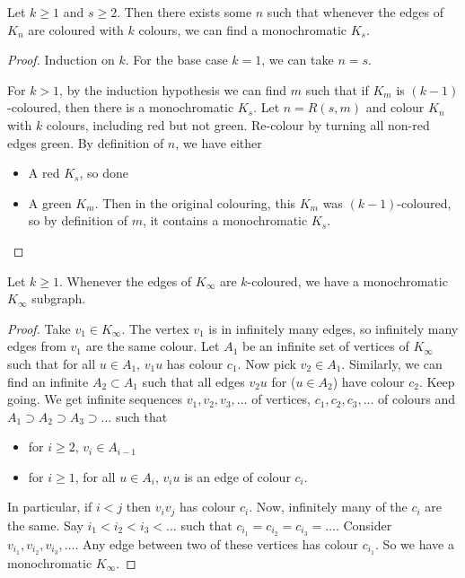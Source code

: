 \documentclass{article}
\newcommand{\red}[1]{\textcolor{bred}{#1}}
\newcommand{\green}[1]{\textcolor{bgreen}{#1}}
\begin{document}
\begin{nthm}\label{thm:multiRamsey}
    Let $k \geq 1$ and $s \geq 2$.
    Then there exists some $n$ such that whenever the edges of $K_n$ are coloured with $k$ colours, we can find a monochromatic $K_s$.
\end{nthm}
\begin{proof}
    Induction on $k$. For the base case $k=1$, we can take $n=s$.

    For $k>1$, by the induction hypothesis we can find $m$ such that if $K_m$ is $(k-1)$-coloured, then there is a monochromatic $K_s$.
    Let $n = R(s, m)$ and colour $K_n$ with $k$ colours, including \red{red} but not \green{green}.
    Re-colour by turning all non-red edges \green{green}.
    By definition of $n$, we have either
    \begin{itemize}
        \item A \red{red $K_s$}, so done
        \item A \green{green $K_m$}. Then in the original colouring, this $K_m$ was $(k-1)$-coloured, so by definition of $m$, it contains a monochromatic $K_s$. \qedhere
    \end{itemize}
\end{proof}

















\begin{nthm}\label{thm:infRamsey}
    Let $k \geq 1$. Whenever the edges of $K_\infty$ are $k$-coloured, we have a monochromatic $K_\infty$ subgraph.
\end{nthm}
\begin{proof}
    Take $v_1 \in K_\infty$.  The vertex $v_1$ is in infinitely many edges, so infinitely many edges from $v_1$ are the same colour.
    Let $A_1$ be an infinite set of vertices of $K_\infty$ such that for all $u \in A_1$, $v_1 u$ has colour $c_1$.
    Now pick $v_2 \in A_1$. Similarly, we can find an infinite $A_2 \subset A_1$ such that all edges $v_2 u$ for ($u \in A_2$) have colour $c_2$.
    Keep going. We get infinite sequences $v_1, v_2, v_3, \dotsc$ of vertices, $c_1, c_2, c_3, \dotsc$ of colours and $A_1 \supset A_2 \supset A_3 \supset \dots$ such that
    \begin{itemize}
        \item for $i \geq 2$, $v_i \in A_{i-1}$
        \item for $i \geq 1$, for all $u \in A_i$, $v_i u$ is an edge of colour $c_i$.
    \end{itemize}
    In particular, if $i < j$ then $v_i v_j$ has colour $c_i$. Now, infinitely many of the $c_i$ are the same.
    Say $i_1 < i_2 < i_3 < \dots$ such that $c_{i_1} = c_{i_2} = c_{i_3} = \dotsc$.
    Consider $v_{i_1}, v_{i_2}, v_{i_3}, \dotsc$. Any edge between two of these vertices has colour $c_{i_1}$. So we have a monochromatic $K_\infty$.
\end{proof}
\end{document}
